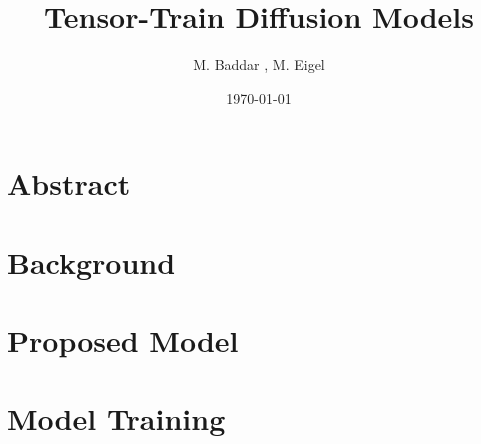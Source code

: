 \documentclass[11pt]{article}
\title{Tensor-Train Diffusion Models }
\author{M. Baddar , M. Eigel}
\date{\today}
\begin{document}
    \maketitle


    \section{Abstract}\label{sec:abstract}


    \section{Background}\label{sec:background}


    \section{Proposed Model}\label{sec:proposed-model}


    \section{Model Training}\label{sec:model-training}
\end{document}
